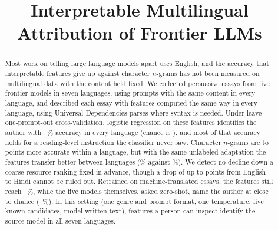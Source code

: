 \documentclass[conference,compsoc]{IEEEtran}
\begin{document}
\title{Interpretable Multilingual Attribution of Frontier LLMs}

\author{
\and
{}
\and
{}
}

\maketitle

\begin{abstract}
Most work on telling large language models apart uses English, and the accuracy that interpretable features give up against character $n$-grams has not been measured on multilingual data with the content held fixed. We collected \NCollected{} persuasive essays from five frontier models in seven languages, using \NPrompts{} prompts with the same content in every language, and described each essay with \NFeatures{} features computed the same way in every language, using Universal Dependencies parses where syntax is needed. Under leave-one-prompt-out cross-validation, logistic regression on these features identifies the author with \LRmin{}--\LRmax{}\% accuracy in every language (chance is \Chance{}), and most of that accuracy holds for a reading-level instruction the classifier never saw. Character $n$-grams are \GapNGmin{} to \GapNGmax{} points more accurate within a language, but with the same unlabeled adaptation the features transfer better between languages (\TransferOff{}\% against \NGFairOff{}\%). We detect no decline down a coarse resource ranking fixed in advance, though a drop of up to \SteepestDeclinePts{} points from English to Hindi cannot be ruled out. Retrained on machine-translated essays, the features still reach \TrAllMin{}--\TrAllMax{}\%, while the five models themselves, asked zero-shot, name the author at close to chance (\JudgeMin{}--\JudgeMax{}\%). In this setting (one genre and prompt format, one temperature, five known candidates, model-written text), features a person can inspect identify the source model in all seven languages.
\end{abstract}
\end{document}
